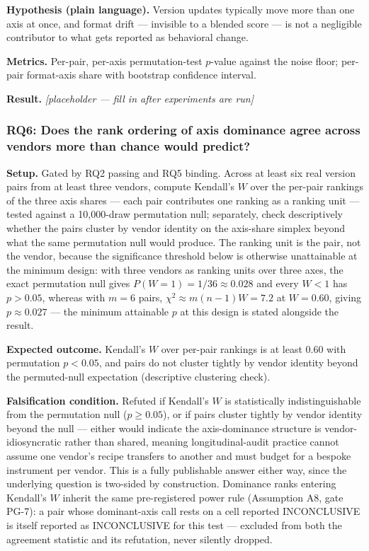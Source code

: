 \documentclass[11pt]{article}
\newcommand{\ph}{\textit{[placeholder --- fill in after experiments are run]}}
\begin{document}
\textbf{Hypothesis (plain language).} Version updates typically move more than one axis at once, and format drift --- invisible to a blended score --- is not a negligible contributor to what gets reported as behavioral change.

\textbf{Metrics.} Per-pair, per-axis permutation-test $p$-value against the noise floor; per-pair format-axis share with bootstrap confidence interval.

\textbf{Result.} \ph

\subsubsection{RQ6: Does the rank ordering of axis dominance agree across vendors more than chance would predict?}
\textbf{Setup.} Gated by RQ2 passing and RQ5 binding. Across at least six real version pairs from at least three vendors, compute Kendall's $W$ over the per-pair rankings of the three axis shares --- each pair contributes one ranking as a ranking unit --- tested against a 10{,}000-draw permutation null; separately, check descriptively whether the pairs cluster by vendor identity on the axis-share simplex beyond what the same permutation null would produce. The ranking unit is the pair, not the vendor, because the significance threshold below is otherwise unattainable at the minimum design: with three vendors as ranking units over three axes, the exact permutation null gives $P(W{=}1) = 1/36 \approx 0.028$ and every $W < 1$ has $p > 0.05$, whereas with $m = 6$ pairs, $\chi^2 \approx m(n{-}1)W = 7.2$ at $W = 0.60$, giving $p \approx 0.027$ --- the minimum attainable $p$ at this design is stated alongside the result.

\textbf{Expected outcome.} Kendall's $W$ over per-pair rankings is at least 0.60 with permutation $p < 0.05$, and pairs do not cluster tightly by vendor identity beyond the permuted-null expectation (descriptive clustering check).

\textbf{Falsification condition.} Refuted if Kendall's $W$ is statistically indistinguishable from the permutation null ($p \geq 0.05$), or if pairs cluster tightly by vendor identity beyond the null --- either would indicate the axis-dominance structure is vendor-idiosyncratic rather than shared, meaning longitudinal-audit practice cannot assume one vendor's recipe transfers to another and must budget for a bespoke instrument per vendor. This is a fully publishable answer either way, since the underlying question is two-sided by construction. Dominance ranks entering Kendall's $W$ inherit the same pre-registered power rule (Assumption A8, gate PG-7): a pair whose dominant-axis call rests on a cell reported INCONCLUSIVE is itself reported as INCONCLUSIVE for this test --- excluded from both the agreement statistic and its refutation, never silently dropped.
\end{document}
